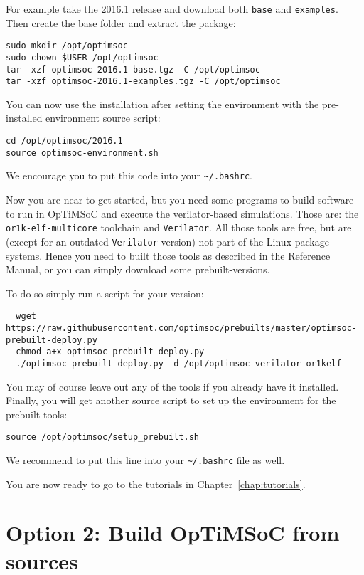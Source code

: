 For example take the 2016.1 release and download both \verb|base| and
\verb|examples|. Then create the base folder and extract the package:

\begin{lstlisting}
sudo mkdir /opt/optimsoc
sudo chown $USER /opt/optimsoc
tar -xzf optimsoc-2016.1-base.tgz -C /opt/optimsoc
tar -xzf optimsoc-2016.1-examples.tgz -C /opt/optimsoc
\end{lstlisting}

You can now use the installation after setting the environment with
the pre-installed environment source script:

\begin{lstlisting}
cd /opt/optimsoc/2016.1
source optimsoc-environment.sh
\end{lstlisting}

We encourage you to put this code into your \verb|~/.bashrc|.

Now you are near to get started, but you need some programs to build
software to run in OpTiMSoC and execute the verilator-based
simulations. Those are: the \verb|or1k-elf-multicore| toolchain and
\verb|Verilator|. All those tools are free, but are (except for an
outdated \verb|Verilator| version) not part of the Linux package
systems. Hence you need to built those tools as described in the
Reference Manual, or you can simply download some prebuilt-versions.

To do so simply run a script for your version:

\begin{lstlisting}
  wget https://raw.githubusercontent.com/optimsoc/prebuilts/master/optimsoc-prebuilt-deploy.py
  chmod a+x optimsoc-prebuilt-deploy.py
  ./optimsoc-prebuilt-deploy.py -d /opt/optimsoc verilator or1kelf
\end{lstlisting}

You may of course leave out any of the tools if you already have it
installed. Finally, you will get another source script to set up the
environment for the prebuilt tools:

\begin{lstlisting}
source /opt/optimsoc/setup_prebuilt.sh
\end{lstlisting}

We recommend to put this line into your \verb|~/.bashrc| file as well.

You are now ready to go to the tutorials in Chapter~\ref{chap:tutorials}.

\section{Option 2: Build OpTiMSoC from sources}

